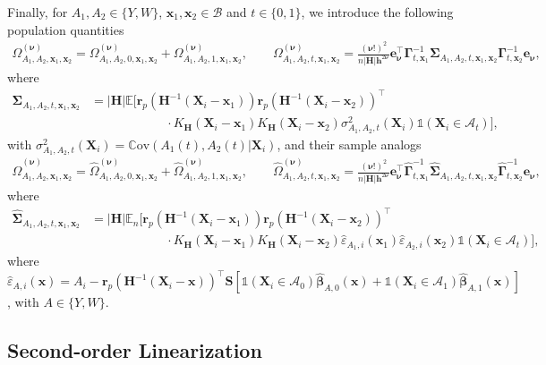 \documentclass[10pt]{article}
\newcommand{\E}{\mathbb{E}}
\newcommand{\Cov}{\mathbb{C}\mathrm{ov}}
\newcommand{\Indicator}{\mathds{1}}
\newcommand{\En}{\mathbb{E}_n}
\newcommand{\be}{\mathbf{e}}
\newcommand{\bh}{\mathbf{h}}
\newcommand{\bH}{\mathbf{H}}
\newcommand{\br}{\mathbf{r}}
\newcommand{\bS}{\mathbf{S}}
\newcommand{\bx}{\mathbf{x}}
\newcommand{\bX}{\mathbf{X}}
\newcommand{\bbeta}{\boldsymbol{\beta}}
\newcommand{\bnu}{\boldsymbol{\nu}}
\newcommand{\bGamma}{\boldsymbol{\Gamma}}
\newcommand{\bSigma}{\boldsymbol{\Sigma}}
\newcommand{\A}{\mathcal{A}}
\newcommand{\B}{\mathcal{B}}
\begin{document}
Finally, for $A_1,A_2\in\{Y,W\}$, $\bx_1, \bx_2 \in \B$ and $t \in \{0,1\}$, we introduce the following population quantities
\begin{align*}
    \Omega_{A_1,A_2,\bx_1,\bx_2}^{(\bnu)}
    = \Omega_{A_1,A_2,0,\bx_1,\bx_2}^{(\bnu)} + \Omega_{A_1,A_2,1,\bx_1,\bx_2}^{(\bnu)},
    \qquad
    \Omega_{A_1,A_2,t,\bx_1,\bx_2}^{(\bnu)}
    = \frac{(\bnu!)^2}{n |\bH|\bh^{2\bnu}} \be_{\bnu}^{\top}  \bGamma_{t,\bx_1}^{-1} \bSigma_{A_1,A_2,t,\bx_1,\bx_2} \bGamma_{t,\bx_2}^{-1} \be_{\bnu},
\end{align*}
where
\begin{align*}
    \bSigma_{A_1,A_2,t, \bx_1,\bx_2}
    &= |\bH| \E \big[\br_p(\bH^{-1}(\bX_i-\bx_1)) \br_p(\bH^{-1}(\bX_i-\bx_2))^{\top}\\
    &\hspace{1in} \cdot K_{\bH}(\bX_i - \bx_1) K_{\bH}(\bX_i - \bx_2) \sigma_{A_1,A_2,t}^2(\bX_i) \Indicator(\bX_i \in \A_t)\big],
\end{align*}
with $\sigma_{A_1,A_2,t}^2(\bX_i) = \Cov(A_1(t),A_2(t)|\bX_i)$, and their sample analogs
\begin{align*}
    \widehat{\Omega}_{A_1,A_2,\bx_1,\bx_2}^{(\bnu)}
    = \widehat{\Omega}_{A_1,A_2,0,\bx_1,\bx_2}^{(\bnu)} + \widehat{\Omega}_{A_1,A_2,1,\bx_1, \bx_2}^{(\bnu)},
    \qquad
    \widehat{\Omega}_{A_1,A_2,t,\bx_1,\bx_2}^{(\bnu)}
    = \frac{(\bnu!)^2}{n |\bH|\bh^{2\bnu}} \be_{\bnu}^{\top} \widehat{\bGamma}_{t,\bx_1}^{-1} \widehat{\bSigma}_{A_1,A_2,t,\bx_1,\bx_2} \widehat{\bGamma}_{t,\bx_2}^{-1} \be_{\bnu},
\end{align*}
where
\begin{align*}
    \widehat{\bSigma}_{A_1,A_2,t,\bx_1,\bx_2}
    &= |\bH| \En \big[\br_p(\bH^{-1}(\bX_i-\bx_1)) \br_p(\bH^{-1}(\bX_i-\bx_2))^{\top}\\
    &\hspace{1in} \cdot K_{\bH}(\bX_i - \bx_1) K_{\bH}(\bX_i - \bx_2) \widehat{\varepsilon}_{A_1,i}(\bx_1) \widehat{\varepsilon}_{A_2,i}(\bx_2) \Indicator(\bX_i \in \A_t)\big],
\end{align*}
where $\widehat{\varepsilon}_{A,i}(\bx) = A_i - \br_p(\bH^{-1}(\bX_i - \bx))^\top\bS[\Indicator(\bX_i \in \A_0) \widehat{\bbeta}_{A,0}(\bx) + \Indicator(\bX_i \in \A_1) \widehat{\bbeta}_{A,1}(\bx)]$, with $A\in\{Y,W\}$.

\subsection{Second-order Linearization}\label{sec: Second-Order Linearization: Fuzzy BATEC}
\end{document}
